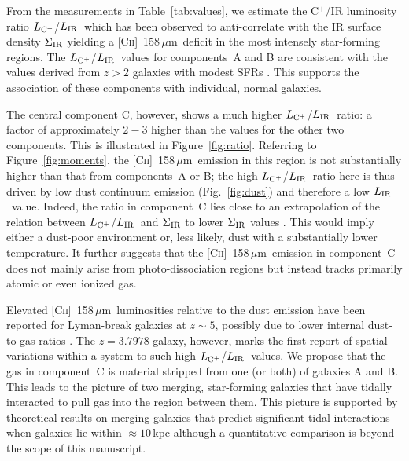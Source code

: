 \documentclass[twocolumn]{aastex62}
\newcommand{\cplus}{[\ctwo]~158\,$\mu$m}
\newcommand{\mldust}{L_{\rm IR}}  %
\newcommand{\ldust}{$\mldust$}
\newcommand{\mlcplus}{L_{\rm C^+}}   %
\newcommand{\lcplus}{$\mlcplus$}
\newcommand{\ctwo}{C\textsc{ii}}
\begin{document}

%


%
From the measurements in Table~\ref{tab:values}, we estimate the C$^+$/IR luminosity ratio 
\lcplus/\ldust\ which has been observed to anti-correlate with the IR surface
density $\Sigma_{\rm IR}$ \citep[e.g.][]{smith+17,litke+19} yielding a \cplus\ 
deficit in the most intensely star-forming regions. The \lcplus/\ldust\ values for 
components~A and B are consistent with the values derived from $z>2$ galaxies with 
modest SFRs \citep[e.g.,][]{capak+15}.
This supports the association of these components with individual, normal galaxies.

The central component C, however, shows a much higher \lcplus/\ldust\ ratio: 
a factor of approximately $2-3$ higher than the values for the other two 
components. This is illustrated in Figure~\ref{fig:ratio}. Referring to Figure~\ref{fig:moments}, 
the \cplus\ emission in this region is not substantially higher than that from components~A or 
B; the high \lcplus/\ldust\ ratio here is thus driven by low dust continuum emission (Fig.~\ref{fig:dust}) and therefore a low \ldust\ value.  Indeed, the 
ratio in component~C lies close to an extrapolation of the relation between \lcplus/\ldust\ 
and  $\Sigma_{\rm IR}$ to lower $\Sigma_{\rm IR}$ values \citep[see also][]{smith+17}. 
This would imply either a dust-poor environment or, less likely, dust with a 
substantially lower temperature. It further suggests that the \cplus\ emission in 
component~C does not mainly arise from photo-dissociation regions but instead tracks 
primarily atomic or even ionized gas.  


Elevated \cplus\ luminosities relative to the dust emission have been reported for Lyman-break
galaxies at $z \sim 5$, possibly due to lower internal dust-to-gas ratios \citep[e.g.][]{capak+15}.
The $z = 3.7978$ galaxy, however, marks the first report of spatial variations within 
a system to such high \lcplus/\ldust\ values. We propose that the gas in component~C is 
material stripped from one (or both) of galaxies A and B. This leads to the picture of 
two merging, star-forming galaxies that have tidally interacted to  pull gas into the region 
between them. This picture is supported by theoretical results on merging galaxies that 
predict significant tidal interactions when galaxies lie within $\approx 10$\,kpc 
\citep{chill+10} %
although a quantitative comparison is beyond the scope of this manuscript.
\end{document}

